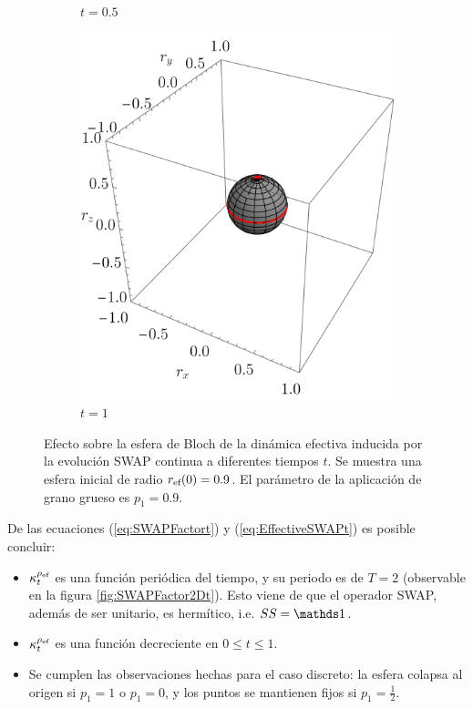 \begin{figure}[ht!]
\begin{subfigure}{0.32\textwidth}
    \caption{$t=0.5$}
  \end{subfigure}
  \begin{subfigure}{0.32\textwidth}
    \centering
    \includegraphics[width=0.9\linewidth]{chapter3/figures_toy/SWAP_t=1._p=0.9_r=0.9.png}
    \caption{$t=1$}
  \end{subfigure}
  \caption{Efecto sobre la esfera de Bloch de la dinámica efectiva inducida por la evolución SWAP continua a diferentes tiempos $t$. Se muestra una esfera inicial de radio $r_{\text{ef}}(0)=0.9$. El parámetro de la aplicación de grano grueso es $p_{1}=0.9$. \label{fig:SWAPFactorSequence}}
  \end{figure}

De las ecuaciones (\ref{eq:SWAPFactort}) y (\ref{eq:EffectiveSWAPt}) es posible concluir:
\begin{itemize}
  \item $\kappa_{t}^{\rho_{\text{ef}}}$ es una función periódica del tiempo, y su periodo es de $T=2$ (observable en la figura \ref{fig:SWAPFactor2Dt}). Esto viene de que el operador SWAP, además de ser unitario, es hermítico, i.e. $SS=\Id$.
  \item $\kappa_{t}^{\rho_{\text{ef}}}$ es una función decreciente en $0\leq t\leq 1$.
  \item Se cumplen las observaciones hechas para el caso discreto: la esfera colapsa al origen si $p_{1}=1$ o $p_{1}=0$, y los puntos se mantienen fijos si $p_{1}=\frac{1}{2}$.
\end{itemize}

